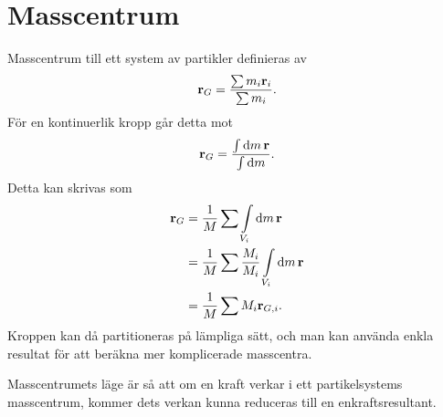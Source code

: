 \section{Masscentrum}
Masscentrum till ett system av partikler definieras av
\begin{align*}
	\vect{r}_G = \frac{\sum m_i\vect{r}_i}{\sum m_i}.
\end{align*}
För en kontinuerlik kropp går detta mot
\begin{align*}
	\vect{r}_G = \frac{\int\dd{m}\vect{r}}{\int\dd{m}}.
\end{align*}
Detta kan skrivas som
\begin{align*}
	\vect{r}_G &= \frac{1}{M}\sum\int\limits_{V_i}\dd{m}\vect{r} \\
	           &= \frac{1}{M}\sum\frac{M_i}{M_i}\int\limits_{V_i}\dd{m}\vect{r} \\
	           &= \frac{1}{M}\sum M_i\vect{r}_{G, i}.
\end{align*}
Kroppen kan då partitioneras på lämpliga sätt, och man kan använda enkla resultat för att beräkna mer komplicerade masscentra.

Masscentrumets läge är så att om en kraft verkar i ett partikelsystems masscentrum, kommer dets verkan kunna reduceras till en enkraftsresultant.


